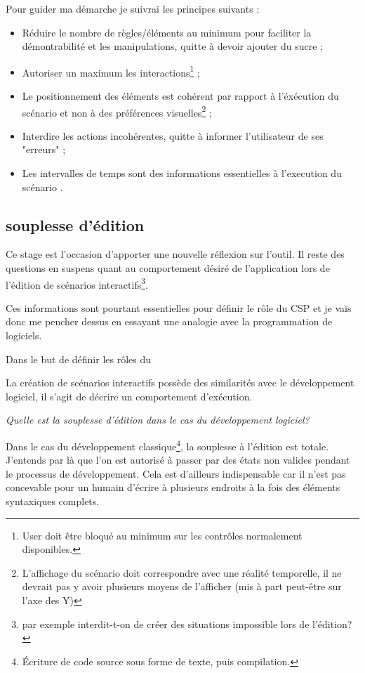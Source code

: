 Pour guider ma démarche je suivrai les principes suivants :
\begin{itemize}
    \item Réduire le nombre de règles/éléments au minimum pour faciliter la démontrabilité et les manipulations, quitte à devoir ajouter du sucre ;
    \item Autoriser un maximum les interactions\footnote{User doit être bloqué au minimum sur les contrôles normalement disponibles.} ;
    \item Le positionnement des éléments est cohérent par rapport à l'éxécution du scénario et non à des préférences visuelles\footnote{L'affichage du scénario doit correspondre avec une réalité temporelle, il ne devrait pas y avoir plusieurs moyens de l'afficher (mis à part peut-être sur l'axe des Y)} ;
    \item Interdire les actions incohérentes, quitte à informer l'utilisateur de ses "erreurs" ;
    \item Les intervalles de temps sont des informations essentielles à l'execution du scénario .
\end{itemize}

\subsection{souplesse d'édition}
Ce stage est l'occasion d'apporter une nouvelle réflexion sur l'outil. Il reste des questions en suspens quant au comportement désiré de l'application lors de l'édition de scénarios interactifs\footnote{par exemple interdit-t-on de créer des situations impossible lors de l'édition?}.


Ces informations sont pourtant essentielles pour définir le rôle du CSP et je vais donc me pencher dessus en essayant une analogie avec la programmation de logiciels.

Dans le but de définir les rôles du \csp{}


La création de scénarios interactifs possède des similarités avec le développement logiciel, il s'agit de décrire un comportement d'exécution.

\emph{Quelle est la souplesse d'édition dans le cas du développement logiciel?}

Dans le cas du développement classique\footnote{Écriture de code source sous forme de texte, puis compilation.}, la souplesse à l'édition est totale. J'entends par là que l'on est autorisé à passer par des états non valides pendant le processus de développement. Cela est d'ailleurs indispensable car il n'est pas concevable pour un humain d'écrire à plusieurs endroits à la fois des éléments syntaxiques complets.

